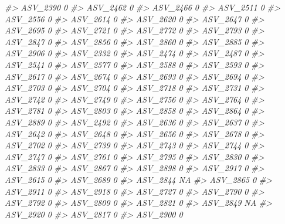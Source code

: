 \documentclass[
]{article}
\newenvironment{Shaded}{\begin{snugshade}}{\end{snugshade}}
\newcommand{\CommentTok}[1]{\textcolor[rgb]{0.56,0.35,0.01}{\textit{#1}}}
\begin{document}
\begin{Shaded}
\begin{Highlighting}[]
\CommentTok{\#\textgreater{} ASV\_2390  0}
\CommentTok{\#\textgreater{} ASV\_2462  0}
\CommentTok{\#\textgreater{} ASV\_2466  0}
\CommentTok{\#\textgreater{} ASV\_2511  0}
\CommentTok{\#\textgreater{} ASV\_2556  0}
\CommentTok{\#\textgreater{} ASV\_2614  0}
\CommentTok{\#\textgreater{} ASV\_2620  0}
\CommentTok{\#\textgreater{} ASV\_2647  0}
\CommentTok{\#\textgreater{} ASV\_2695  0}
\CommentTok{\#\textgreater{} ASV\_2721  0}
\CommentTok{\#\textgreater{} ASV\_2772  0}
\CommentTok{\#\textgreater{} ASV\_2793  0}
\CommentTok{\#\textgreater{} ASV\_2847  0}
\CommentTok{\#\textgreater{} ASV\_2856  0}
\CommentTok{\#\textgreater{} ASV\_2860  0}
\CommentTok{\#\textgreater{} ASV\_2885  0}
\CommentTok{\#\textgreater{} ASV\_2906  0}
\CommentTok{\#\textgreater{} ASV\_2332  0}
\CommentTok{\#\textgreater{} ASV\_2474  0}
\CommentTok{\#\textgreater{} ASV\_2487  0}
\CommentTok{\#\textgreater{} ASV\_2541  0}
\CommentTok{\#\textgreater{} ASV\_2577  0}
\CommentTok{\#\textgreater{} ASV\_2588  0}
\CommentTok{\#\textgreater{} ASV\_2593  0}
\CommentTok{\#\textgreater{} ASV\_2617  0}
\CommentTok{\#\textgreater{} ASV\_2674  0}
\CommentTok{\#\textgreater{} ASV\_2693  0}
\CommentTok{\#\textgreater{} ASV\_2694  0}
\CommentTok{\#\textgreater{} ASV\_2703  0}
\CommentTok{\#\textgreater{} ASV\_2704  0}
\CommentTok{\#\textgreater{} ASV\_2718  0}
\CommentTok{\#\textgreater{} ASV\_2731  0}
\CommentTok{\#\textgreater{} ASV\_2742  0}
\CommentTok{\#\textgreater{} ASV\_2749  0}
\CommentTok{\#\textgreater{} ASV\_2756  0}
\CommentTok{\#\textgreater{} ASV\_2764  0}
\CommentTok{\#\textgreater{} ASV\_2781  0}
\CommentTok{\#\textgreater{} ASV\_2803  0}
\CommentTok{\#\textgreater{} ASV\_2858  0}
\CommentTok{\#\textgreater{} ASV\_2864  0}
\CommentTok{\#\textgreater{} ASV\_2889  0}
\CommentTok{\#\textgreater{} ASV\_2492  0}
\CommentTok{\#\textgreater{} ASV\_2636  0}
\CommentTok{\#\textgreater{} ASV\_2637  0}
\CommentTok{\#\textgreater{} ASV\_2642  0}
\CommentTok{\#\textgreater{} ASV\_2648  0}
\CommentTok{\#\textgreater{} ASV\_2656  0}
\CommentTok{\#\textgreater{} ASV\_2678  0}
\CommentTok{\#\textgreater{} ASV\_2702  0}
\CommentTok{\#\textgreater{} ASV\_2739  0}
\CommentTok{\#\textgreater{} ASV\_2743  0}
\CommentTok{\#\textgreater{} ASV\_2744  0}
\CommentTok{\#\textgreater{} ASV\_2747  0}
\CommentTok{\#\textgreater{} ASV\_2761  0}
\CommentTok{\#\textgreater{} ASV\_2795  0}
\CommentTok{\#\textgreater{} ASV\_2830  0}
\CommentTok{\#\textgreater{} ASV\_2833  0}
\CommentTok{\#\textgreater{} ASV\_2867  0}
\CommentTok{\#\textgreater{} ASV\_2898  0}
\CommentTok{\#\textgreater{} ASV\_2917  0}
\CommentTok{\#\textgreater{} ASV\_2615  0}
\CommentTok{\#\textgreater{} ASV\_2689  0}
\CommentTok{\#\textgreater{} ASV\_2844 NA}
\CommentTok{\#\textgreater{} ASV\_2865  0}
\CommentTok{\#\textgreater{} ASV\_2911  0}
\CommentTok{\#\textgreater{} ASV\_2918  0}
\CommentTok{\#\textgreater{} ASV\_2727  0}
\CommentTok{\#\textgreater{} ASV\_2790  0}
\CommentTok{\#\textgreater{} ASV\_2792  0}
\CommentTok{\#\textgreater{} ASV\_2809  0}
\CommentTok{\#\textgreater{} ASV\_2821  0}
\CommentTok{\#\textgreater{} ASV\_2849 NA}
\CommentTok{\#\textgreater{} ASV\_2920  0}
\CommentTok{\#\textgreater{} ASV\_2817  0}
\CommentTok{\#\textgreater{} ASV\_2900  0}
\end{Highlighting}
\end{Shaded}
\end{document}
